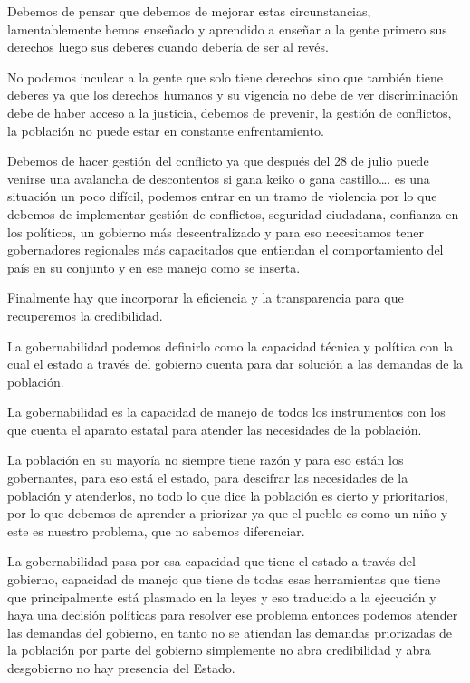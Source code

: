 \documentclass[
  jou,
  floatsintext,
  longtable,
  a4paper,
  nolmodern,
  notxfonts,
  notimes,
  12pt,
  colorlinks=true,linkcolor=blue,citecolor=blue,urlcolor=blue]{apa7}
\begin{document}
Debemos de pensar que debemos de mejorar estas circunstancias,
lamentablemente hemos enseñado y aprendido a enseñar a la gente primero
sus derechos luego sus deberes cuando debería de ser al revés.

No podemos inculcar a la gente que solo tiene derechos sino que también
tiene deberes ya que los derechos humanos y su vigencia no debe de ver
discriminación debe de haber acceso a la justicia, debemos de prevenir,
la gestión de conflictos, la población no puede estar en constante
enfrentamiento.

Debemos de hacer gestión del conflicto ya que después del 28 de julio
puede venirse una avalancha de descontentos si gana keiko o gana
castillo\ldots. es una situación un poco difícil, podemos entrar en un
tramo de violencia por lo que debemos de implementar gestión de
conflictos, seguridad ciudadana, confianza en los políticos, un gobierno
más descentralizado y para eso necesitamos tener gobernadores regionales
más capacitados que entiendan el comportamiento del país en su conjunto
y en ese manejo como se inserta.

Finalmente hay que incorporar la eficiencia y la transparencia para que
recuperemos la credibilidad.

La gobernabilidad podemos definirlo como la capacidad técnica y política
con la cual el estado a través del gobierno cuenta para dar solución a
las demandas de la población.

La gobernabilidad es la capacidad de manejo de todos los instrumentos
con los que cuenta el aparato estatal para atender las necesidades de la
población.

La población en su mayoría no siempre tiene razón y para eso están los
gobernantes, para eso está el estado, para descifrar las necesidades de
la población y atenderlos, no todo lo que dice la población es cierto y
prioritarios, por lo que debemos de aprender a priorizar ya que el
pueblo es como un niño y este es nuestro problema, que no sabemos
diferenciar.

La gobernabilidad pasa por esa capacidad que tiene el estado a través
del gobierno, capacidad de manejo que tiene de todas esas herramientas
que tiene que principalmente está plasmado en la leyes y eso traducido a
la ejecución y haya una decisión políticas para resolver ese problema
entonces podemos atender las demandas del gobierno, en tanto no se
atiendan las demandas priorizadas de la población por parte del gobierno
simplemente no abra credibilidad y abra desgobierno no hay presencia del
Estado.
\end{document}
